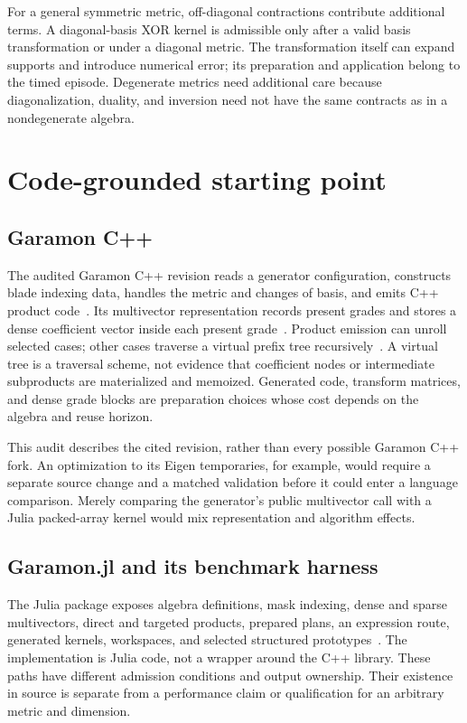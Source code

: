 \documentclass[11pt,a4paper]{article}
\begin{document}
For a general symmetric metric, off-diagonal contractions contribute
additional terms. A diagonal-basis XOR kernel is admissible only after
a valid basis transformation or under a diagonal metric. The
transformation itself can expand supports and introduce numerical
error; its preparation and application belong to the timed episode.
Degenerate metrics need additional care because diagonalization,
duality, and inversion need not have the same contracts as in a
nondegenerate algebra.

\section{Code-grounded starting point}
\subsection{Garamon C++}
The audited Garamon C++ revision reads a generator configuration,
constructs blade indexing data, handles the metric and changes of
basis, and emits C++ product code~\cite{cppmain,cppindex,cppmetric}.
Its multivector representation records present grades and stores a
dense coefficient vector inside each present grade~\cite{cppmvec}.
Product emission can unroll selected cases; other cases traverse a
virtual prefix tree recursively~\cite{cppdispatch,cppgeometric}. A
virtual tree is a traversal scheme, not evidence that coefficient
nodes or intermediate subproducts are materialized and memoized.
Generated code, transform matrices, and dense grade blocks are
preparation choices whose cost depends on the algebra and reuse
horizon.

This audit describes the cited revision, rather than every possible
Garamon C++ fork. An optimization to its Eigen temporaries, for
example, would require a separate source change and a matched
validation before it could enter a language comparison. Merely
comparing the generator's public multivector call with a Julia
packed-array kernel would mix representation and algorithm effects.

\subsection{Garamon.jl and its benchmark harness}
The Julia package exposes algebra definitions, mask indexing,
dense and sparse multivectors, direct and targeted products,
prepared plans, an expression route, generated kernels, workspaces,
and selected structured prototypes~\cite{garamonjulia}. The
implementation is Julia code, not a wrapper around the C++ library.
These paths have different admission conditions and output
ownership. Their existence in source is separate from a performance
claim or qualification for an arbitrary metric and dimension.
\end{document}
